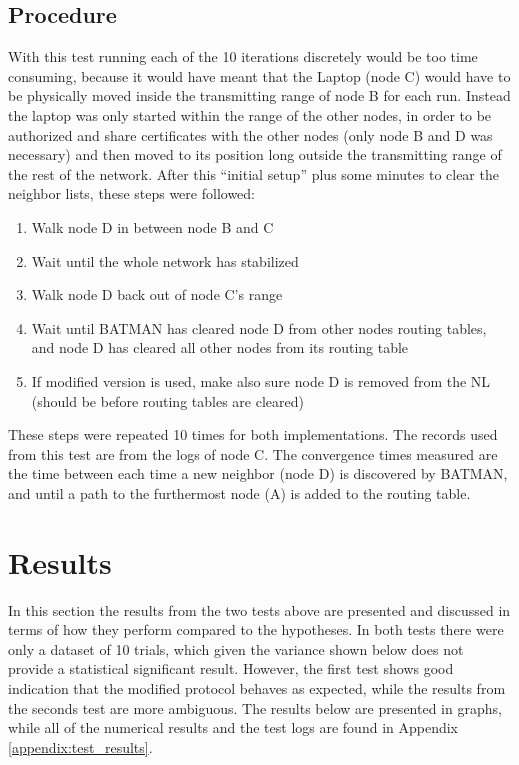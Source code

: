 \subsection{Procedure}
With this test running each of the 10 iterations discretely would be too time
consuming, because it would have meant that the Laptop (node C) would have to be
physically moved inside the transmitting range of node B for each run. Instead
the laptop was only started within the range of the other nodes, in order to be
authorized and share certificates with the other nodes (only node B and D was
necessary) and then moved to its position long outside the transmitting range of
the rest of the network. After this ``initial setup'' plus some minutes to
clear the neighbor lists, these steps were followed:
\begin{enumerate}
  \item Walk node D in between node B and C
  \item Wait until the whole network has stabilized
  \item Walk node D back out of node C's range
  \item Wait until BATMAN has cleared node D from other nodes routing tables,
  and node D has cleared all other nodes from its routing table
  \item If modified version is used, make also sure node D is removed from the
  \ac{NL} (should be before routing tables are cleared)
\end{enumerate}
These steps were repeated 10 times for both implementations. The records used
from this test are from the logs of node C. The convergence times measured
are the time between each time a new neighbor (node D) is discovered by BATMAN,
and until a path to the furthermost node (A) is added to the routing table.


\section{Results}
In this section the results from the two tests above are presented and discussed
in terms of how they perform compared to the hypotheses. In both tests there
were only a dataset of 10 trials, which given the variance shown below does not
provide a statistical significant result. However, the first test shows good
indication that the modified protocol behaves as expected, while the results
from the seconds test are more ambiguous. The results below are presented in
graphs, while all of the numerical results and the test logs are found in
Appendix \ref{appendix:test_results}.


